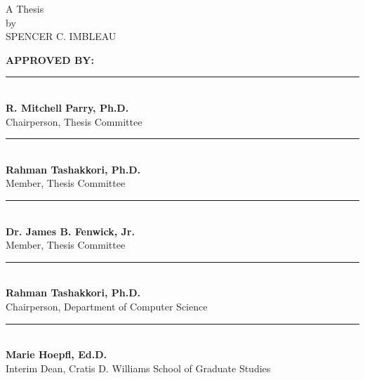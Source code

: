 \vspace*{0.125in}
\vfill
\begin{center}
\begin{spacing}{1.1}
\begin{adjustwidth}{2cm}{2cm}
\begin{center}
\large{\thesistitle}
\end{center}
\end{adjustwidth}
\end{spacing}
\normalsize
\vfill
A Thesis\\
by\\
SPENCER C. IMBLEAU\\
\graduationdate
\end{center}
\vfill

\begin{flushleft}
\textbf{APPROVED BY:}\\
\bigskip
\bigskip


\rule{3in}{.1pt}\\
\textbf{R. Mitchell Parry, Ph.D.}\\
Chairperson, Thesis Committee\\
\bigskip
\bigskip

\rule{3in}{.1pt}\\
\textbf{Rahman Tashakkori, Ph.D.}\\
Member, Thesis Committee\\
\bigskip
\bigskip

\rule{3in}{.1pt}\\
\textbf{Dr. James B. Fenwick, Jr.}\\
Member, Thesis Committee\\
\bigskip
\bigskip

\rule{3in}{.1pt}\\
\textbf{Rahman Tashakkori, Ph.D.}\\
Chairperson, Department of Computer Science\\
\bigskip
\bigskip

\rule{3in}{.1pt}\\
\textbf{Marie Hoepfl, Ed.D.}\\
Interim Dean, Cratis D. Williams School of Graduate Studies
\end{flushleft}


\thispagestyle{empty}
\clearpage